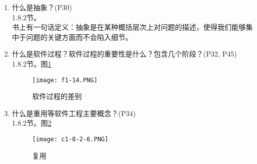 \documentclass[14pt, letterpaper, UTF8, fontset=windowsnew, heading=true]{article}
\begin{document}
\begin{enumerate}

	\item
	什么是抽象？(P30)\\
	1.8.2节。\\ 书上有一句话定义：抽象是在某种概括层次上对问题的描述，使得我们能够集中于问题的关键方面而不会陷入细节。
	
	\item
	什么是软件过程？软件过程的重要性是什么？包含几个阶段？(P32, P45) \\ 1.8.2节。图\ref{fig:procedure-differences}
	\begin{figure}[h]
		\centering
		\texttt{[image: f1-14.PNG]}
		\caption{软件过程的差别}
		\label{fig:procedure-differences}
	\end{figure}
	
	\item
	什么是重用等软件工程主要概念？(P34) \\ 1.8.2节。图\ref{fig:multiplexing}
	\begin{figure}[h]
		\centering
		\texttt{[image: c1-8-2-6.PNG]}
		\caption{复用}
		\label{fig:multiplexing}
	\end{figure}
	
\end{enumerate}

\end{document}
